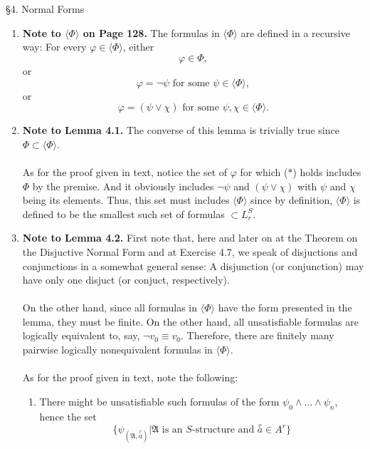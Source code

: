 \
\\
\\
{\large \S4. Normal Forms}
\begin{enumerate}[1.]
\item \textbf{Note to $\langle \Phi \rangle$ on Page 128.} The formulas in $\langle \Phi \rangle$ are defined in a recursive way: For every $\varphi \in \langle \Phi \rangle$, either
\[
\varphi \in \Phi,
\]
or
\[
\mbox{$\varphi = \neg \psi$ for some $\psi \in \langle \Phi \rangle$},
\]
or
\[
\mbox{$\varphi = (\psi \lor \chi)$ for some $\psi, \chi \in \langle \Phi \rangle$}.
\]
%
\item \textbf{Note to Lemma 4.1.} The converse of this lemma is trivially true since $\Phi \subset \langle \Phi \rangle$.\\
\ \\
As for the proof given in text, notice the set of $\varphi$ for which ($*$) holds includes $\Phi$ by the premise. And it obviously includes $\neg \psi$ and $(\psi \lor \chi)$ with $\psi$ and $\chi$ being its elements. Thus, this set must includes $\langle \Phi \rangle$ since by definition, $\langle \Phi \rangle$ is defined to be the smallest such set of formulas $\subset L^S_r$.
%
\item \textbf{Note to Lemma 4.2.} First note that, here and later on at the Theorem on the Disjuctive Normal Form and at Exercise 4.7, we speak of disjuctions and conjunctions in a somewhat general sense: A disjunction (or conjunction) may have only one disjuct (or conjuct, respectively).\\
\ \\
On the other hand, since all formulas in $\langle \Phi \rangle$ have the form presented in the lemma, they must be finite. On the other hand, all unsatisfiable formulas are logically equivalent to, say, $\neg v_0 \equiv v_0$. Therefore, there are finitely many pairwise logically nonequivalent formulas in $\langle \Phi \rangle$.\\
\ \\
As for the proof given in text, note the following:
\begin{enumerate}[(1)]
\item There might be unsatisfiable such formulas of the form $\psi_0 \land \ldots \land \psi_n$, hence the set
\[
\{ \psi_{(\mathfrak{A}, \stackrel{r}{a})} | \mbox{$\mathfrak{A}$ is an $S$-structure and $\stackrel{r}{a} \in A^r$} \}
\]
\end{enumerate}
\end{enumerate}
